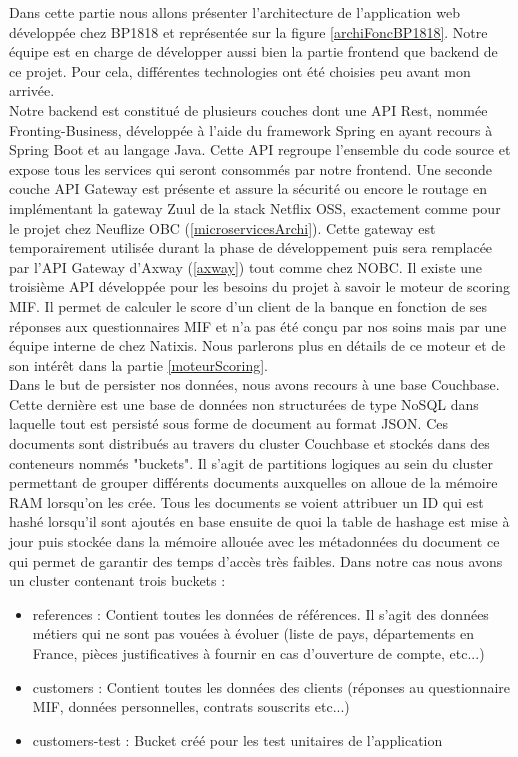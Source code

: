 	Dans cette partie nous allons présenter l'architecture de l'application web développée chez BP1818 et représentée sur la figure \ref{archiFoncBP1818}. Notre équipe est en charge de développer aussi bien la partie frontend que backend de ce projet. Pour cela, différentes technologies ont été choisies peu avant mon arrivée. \\
	
	Notre backend est constitué de plusieurs couches dont une API Rest, nommée Fronting-Business, développée à l'aide du framework Spring en ayant recours à Spring Boot et au langage Java. Cette API regroupe l'ensemble du code source et expose tous les services qui seront consommés par notre frontend. Une seconde couche API Gateway est présente et assure la sécurité ou encore le routage en implémentant la gateway Zuul de la stack Netflix OSS, exactement comme pour le projet chez Neuflize OBC (\ref{microservicesArchi}). Cette gateway est temporairement utilisée durant la phase de développement puis sera remplacée par l'API Gateway d'Axway (\ref{axway}) tout comme chez NOBC. Il existe une troisième API développée pour les besoins du projet à savoir le moteur de scoring MIF. Il permet de calculer le score d'un client de la banque en fonction de ses réponses aux questionnaires MIF et n'a pas été conçu par nos soins mais par une équipe interne de chez Natixis. Nous parlerons plus en détails de ce moteur et de son intérêt dans la partie \ref{moteurScoring}. \\
	
	Dans le but de persister nos données, nous avons recours à une base Couchbase. Cette dernière est une base de données non structurées de type NoSQL dans laquelle tout est persisté sous forme de document au format JSON. Ces documents sont distribués au travers du cluster Couchbase et stockés dans des conteneurs nommés "buckets". Il s'agit de partitions logiques au sein du cluster permettant de grouper différents documents auxquelles on alloue de la mémoire RAM lorsqu'on les crée. Tous les documents se voient attribuer un ID qui est hashé lorsqu'il sont ajoutés en base ensuite de quoi la table de hashage est mise à jour puis stockée dans la mémoire allouée avec les métadonnées du document ce qui permet de garantir des temps d'accès très faibles. Dans notre cas nous avons un cluster contenant trois buckets :
	\begin{itemize}
		\item references : Contient toutes les données de références. Il s'agit des données métiers qui ne sont pas vouées à évoluer (liste de pays, départements en France, pièces justificatives à fournir en cas d'ouverture de compte, etc...)
		\item customers : Contient toutes les données des clients (réponses au questionnaire MIF, données personnelles, contrats souscrits etc...)
		\item customers-test : Bucket créé pour les test unitaires de l'application \\
	\end{itemize}
	
